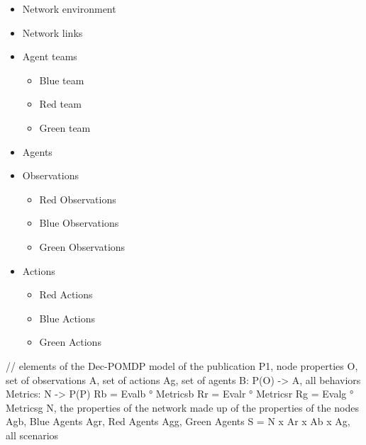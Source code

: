 \documentclass[conference]{IEEEtran}
\begin{document}
\begin{itemize}
    \item Network environment %
    \item Network links %
    \item Agent teams %
    \begin{itemize}
    \item Blue team
    \item Red team
    \item Green team
    \end{itemize}
    \item Agents %
    \item Observations %
    \begin{itemize}
        \item Red Observations %
        \item Blue Observations %
        \item Green Observations
    \end{itemize}
    \item Actions %
    \begin{itemize}
        \item Red Actions %
        \item Blue Actions %
        \item Green Actions %
    \end{itemize}
\end{itemize}

// elements of the Dec-POMDP model of the publication
P1, node properties
O, set of observations
A, set of actions
Ag, set of agents
B: P(O) -> A, all behaviors
Metrics: N -> P(P)
Rb = Evalb ° Metricsb
Rr = Evalr ° Metricsr
Rg = Evalg ° Metricsg
N, the properties of the network made up of the properties of the nodes
Agb, Blue Agents
Agr, Red Agents
Agg, Green Agents
S = N x Ar x Ab x Ag, all scenarios
\end{document}
